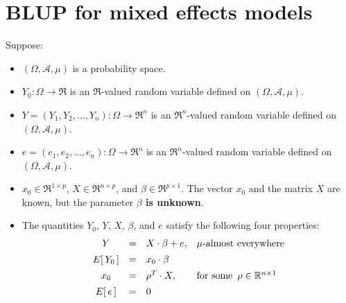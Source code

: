 

\section{BLUP for mixed effects models}
\setcounter{theorem}{0}
\setcounter{equation}{0}

\renewcommand{\theenumi}{\roman{enumi}}
\renewcommand{\labelenumi}{\textnormal{(\theenumi)}$\;\;$}


\begin{theorem}
\label{AMixedModelEquivalentFixedModel}
\mbox{}
\vskip 0.2cm
\noindent
Suppose:
\begin{itemize}
\item
	$(\Omega,\mathcal{A},\mu)$ is a probability space.
\item
	$Y_{0} : \Omega \longrightarrow \Re$ is an $\Re$-valued random variable
	defined on $(\Omega,\mathcal{A},\mu)$.
\item
	$Y = (Y_{1}, Y_{2}, \ldots, Y_{n}) : \Omega \longrightarrow \Re^{n}$ is an $\Re^{n}$-valued random variable
	defined on $(\Omega,\mathcal{A},\mu)$.
\item
	$e = (e_{1}, e_{2}, \ldots, e_{n}) : \Omega \longrightarrow \Re^{n}$ is an $\Re^{n}$-valued random variable
	defined on $(\Omega,\mathcal{A},\mu)$.
\item
	$x_{0} \in \Re^{1 \times p}$, $X \in \Re^{n \times p}$, and $\beta \in \Re^{p \times 1}$.
	\vskip 0.0cm
	The vector $x_{0}$ and the matrix $X$ are known,
	but the parameter \textbf{\color{red}$\beta$ is unknown}.
\item
	The quantities $Y_{0}$, $Y$, $X$, $\beta$, and $e$ satisfy the following four properties:
	\begin{equation*}
	\begin{array}{ccll}
	Y & = & X \cdot \beta + e, & \textnormal{$\mu$-almost everywhere}
	\\
	E\!\left[\,Y_{0}\,\right] &\overset{{\color{white}\vert}}{=}& x_{0} \cdot \beta
	\\
	x_{0} &\overset{{\color{white}\vert}}{=}& \rho^{T} \cdot X, & \textnormal{for some \,$\rho \in \Re^{n \times 1}$}
	\\
	E\!\left[\,e\,\right] &\overset{{\color{white}\vert}}{=}& 0
	\end{array}

\end{equation*}
\end{itemize}
\end{theorem}
